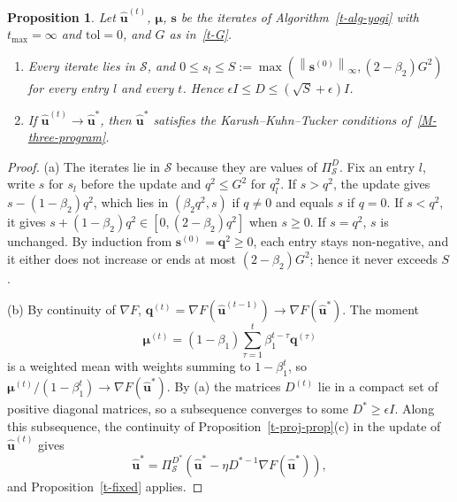 \documentclass[11pt]{article}
\theoremstyle{plain}
\newtheorem{proposition}[theorem]{Proposition}
\theoremstyle{remark}
\numberwithin{equation}{section}
\begin{document}
\begin{proposition}\label{t-yogi-limit}
Let $\widehat{\bm u}^{(t)}$, $\bm\mu$, $\bm s$ be the iterates of
Algorithm~\ref{t-alg-yogi} with $t_{\max}=\infty$ and $\mathrm{tol}=0$, and
$G$ as in~\eqref{t-G}.
\begin{enumerate}
\item[(a)] Every iterate lies in $\mathcal{S}$, and
$0\le s_l\le S:=\max\left(\left\|\bm s^{(0)}\right\|_\infty,(2-\beta_2)G^2\right)$
for every entry $l$ and every $t$. Hence
$\epsilon I\le D\le\left(\sqrt{S}+\epsilon\right)I$.
\item[(b)] If $\widehat{\bm u}^{(t)}\to\widehat{\bm u}^*$, then
$\widehat{\bm u}^*$ satisfies the Karush--Kuhn--Tucker conditions
of~\eqref{M-three-program}.
\end{enumerate}
\end{proposition}
\begin{proof}
(a) The iterates lie in $\mathcal{S}$ because they are values of
$\Pi^D_{\mathcal{S}}$. Fix an entry $l$, write $s$ for $s_l$ before the update
and $q^2\le G^2$ for $q_l^2$. If $s>q^2$, the update gives
$s-(1-\beta_2)q^2$, which lies in $\left(\beta_2q^2,s\right)$ if $q\ne 0$ and
equals $s$ if $q=0$. If $s<q^2$, it gives $s+(1-\beta_2)q^2\in\left[0,(2-\beta_2)q^2\right]$
when $s\ge 0$. If $s=q^2$, $s$ is unchanged. By induction from
$\bm s^{(0)}=\bm q^2\ge 0$, each entry stays non-negative, and it either does
not increase or ends at most $(2-\beta_2)G^2$; hence it never exceeds $S$.

(b) By continuity of $\nabla F$,
$\bm q^{(t)}=\nabla F\left(\widehat{\bm u}^{(t-1)}\right)\to\nabla F\left(\widehat{\bm u}^*\right)$.
The moment
\begin{equation*}
\bm\mu^{(t)}=(1-\beta_1)\sum_{\tau=1}^t\beta_1^{t-\tau}\bm q^{(\tau)}
\end{equation*}
is a weighted mean with weights summing to $1-\beta_1^t$, so
$\bm\mu^{(t)}/\left(1-\beta_1^t\right)\to\nabla F\left(\widehat{\bm u}^*\right)$.
By (a) the matrices $D^{(t)}$ lie in a compact set of positive diagonal
matrices, so a subsequence converges to some $D^*\ge\epsilon I$. Along this
subsequence, the continuity of Proposition~\ref{t-proj-prop}(c) in the update
of $\widehat{\bm u}^{(t)}$ gives
\begin{equation*}
\widehat{\bm u}^*=\Pi^{D^*}_{\mathcal{S}}\left(\widehat{\bm u}^*-\eta D^{*-1}\nabla F\left(\widehat{\bm u}^*\right)\right),
\end{equation*}
and Proposition~\ref{t-fixed} applies.
\end{proof}
\end{document}
